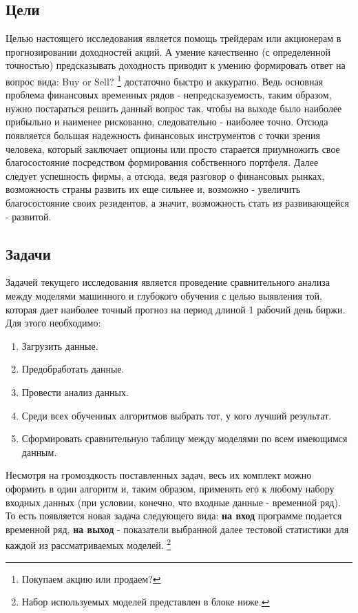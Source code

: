	\subsection{Цели}
		Целью настоящего исследования является помощь трейдерам или акционерам в прогнозировании доходностей акций. А умение качественно (с определенной точностью) предсказывать доходность приводит к умению формировать ответ на вопрос вида: Buy or Sell? \footnote{Покупаем акцию или продаем?} достаточно быстро и аккуратно. Ведь основная проблема финансовых временных рядов - непредсказуемость, таким образом, нужно постараться решить данный вопрос так, чтобы на выходе было наиболее прибыльно и наименее рискованно, следовательно - наиболее точно. Отсюда появляется большая надежность финансовых инструментов с точки зрения человека, который заключает опционы или просто старается приумножить свое благосостояние посредством формирования собственного портфеля. Далее следует успешность фирмы, а отсюда, ведя разговор о финансовых рынках, возможность страны развить их еще сильнее и, возможно - увеличить благосостояние своих резидентов, а значит, возможность стать из развивающейся - развитой. 
	\subsection{Задачи}
		Задачей текущего исследования является проведение сравнительного анализа между моделями машинного и глубокого обучения с целью выявления той, которая дает наиболее точный прогноз на период длиной 1 рабочий день биржи. Для этого необходимо:
		\begin{enumerate}
			\item Загрузить данные.
			\item Предобработать данные.
			\item Провести анализ данных.
			\item Среди всех обученных алгоритмов выбрать тот, у кого лучший результат.
			\item Сформировать сравнительную таблицу между моделями по всем имеющимся данным.
		\end{enumerate}
		Несмотря на громоздкость поставленных задач, весь их комплект можно оформить в один алгоритм и, таким образом, применять его к любому набору входных данных (при условии, конечно, что входные данные - временной ряд). То есть появляется новая задача следующего вида: \textbf{на вход} программе подается временной ряд, \textbf{на выход} - показатели выбранной далее  тестовой статистики для каждой из рассматриваемых моделей. \footnote{Набор используемых моделей представлен в блоке ниже.}                  
